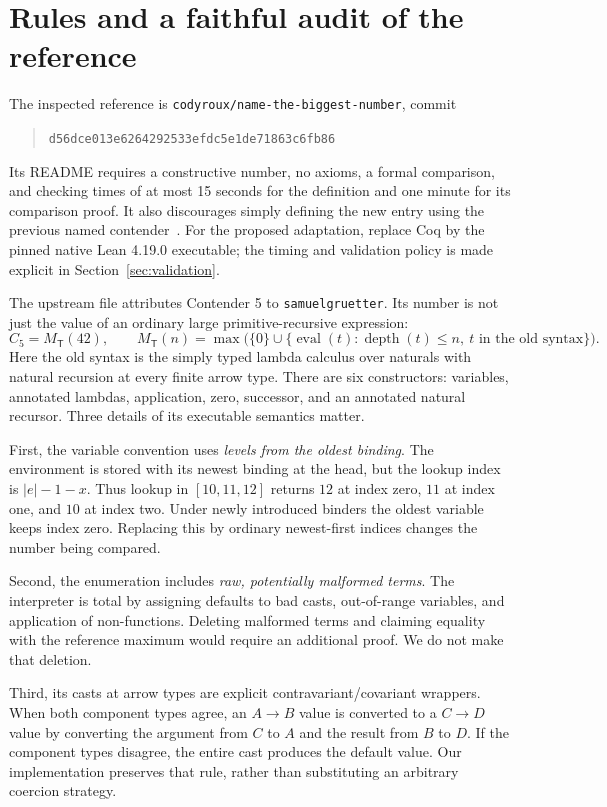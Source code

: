 \documentclass[11pt]{article}
\theoremstyle{definition}
\newcommand{\T}{\mathsf T}
\newcommand{\ev}{\operatorname{eval}}
\newcommand{\dep}{\operatorname{depth}}
\newcommand{\MT}{M_{\T}}
\newcommand{\Cfive}{C_5}
\begin{document}
\section{Rules and a faithful audit of the reference}
The inspected reference is \texttt{codyroux/name-the-biggest-number}, commit
\begin{quote}\small\texttt{d56dce013e6264292533efdc5e1de71863c6fb86}\end{quote} Its README requires a constructive
number, no axioms, a formal comparison, and checking times of at most 15 seconds
for the definition and one minute for its comparison proof. It also discourages
simply defining the new entry using the previous named contender~\cite{roux}.
For the proposed adaptation, replace Coq by the pinned native Lean 4.19.0
executable; the timing and validation policy is made explicit in
Section~\ref{sec:validation}.

The upstream file attributes Contender 5 to \texttt{samuelgruetter}. Its number
is not just the value of an ordinary large primitive-recursive expression:
\begin{equation}\label{eq:c5}
 \Cfive=\MT(42),\qquad
 \MT(n)=\max\bigl(\{0\}\cup\{\ev(t):\dep(t)\le n,
                                     \ t\text{ in the old syntax}\}\bigr).
\end{equation}
Here the old syntax is the simply typed lambda calculus over naturals with
natural recursion at every finite arrow type. There are six constructors:
variables, annotated lambdas, application, zero, successor, and an annotated
natural recursor. Three details of its executable semantics matter.

First, the variable convention uses \emph{levels from the oldest binding}.
The environment is stored with its newest binding at the head, but the lookup
index is $|e|-1-x$. Thus lookup in $[10,11,12]$ returns $12$ at index zero,
$11$ at index one, and $10$ at index two. Under newly introduced binders the
oldest variable keeps index zero. Replacing this by ordinary newest-first
indices changes the number being compared.

Second, the enumeration includes \emph{raw, potentially malformed terms}.
The interpreter is total by assigning defaults to bad casts, out-of-range
variables, and application of non-functions. Deleting malformed terms and
claiming equality with the reference maximum would require an additional proof.
We do not make that deletion.

Third, its casts at arrow types are explicit contravariant/covariant wrappers.
When both component types agree, an $A\to B$ value is converted to a $C\to D$
value by converting the argument from $C$ to $A$ and the result from $B$ to $D$.
If the component types disagree, the entire cast produces the default value.
Our implementation preserves that rule, rather than substituting an arbitrary
coercion strategy.
\end{document}
